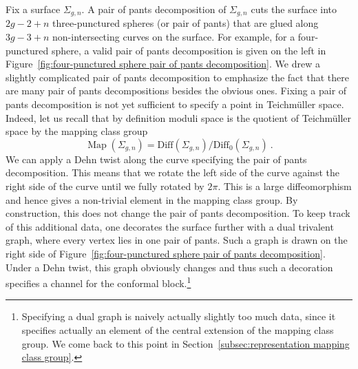 \documentclass[12pt,a4paper]{article}
\newcommand{\be}{\begin{equation}}
\newcommand{\ee}{\end{equation}}
\newcommand\Diff{\text{Diff}}
\DeclareMathOperator\Map{Map}
\begin{document}
Fix a surface $\Sigma_{g,n}$. A pair of pants decomposition of $\Sigma_{g,n}$ cuts the surface  into $2g-2+n$ three-punctured spheres (or pair of pants) that are glued along $3g-3+n$ non-intersecting curves on the surface. For example, for a four-punctured sphere, a valid pair of pants decomposition is given on the left in Figure~\ref{fig:four-punctured sphere pair of pants decomposition}. We drew a slightly complicated pair of pants decomposition to emphasize the fact that there are many pair of pants decompositions besides the obvious ones. Fixing a pair of pants decomposition is not yet sufficient to specify a point in Teichm\"uller space. Indeed, let us recall that by definition moduli space is the quotient of Teichm\"uller space by the mapping class group
\be 
\Map(\Sigma_{g,n})=\Diff(\Sigma_{g,n})/\Diff_0(\Sigma_{g,n})\ .
\ee
We can apply a Dehn twist along the curve specifying the pair of pants decomposition. This means that we rotate the left side of the curve against the right side of the curve until we fully rotated by $2\pi$. This is a large diffeomorphism and hence gives a non-trivial element in the mapping class group. By construction, this does not change the pair of pants decomposition. To keep track of this additional data, one decorates the surface further with a dual trivalent graph, where every vertex lies in one pair of pants. Such a graph is drawn on the right side of Figure~\ref{fig:four-punctured sphere pair of pants decomposition}. Under a Dehn twist, this graph obviously changes and thus such a decoration specifies a channel for the conformal block.\footnote{Specifying a dual graph is naively actually slightly too much data, since it specifies actually an element of the central extension of the mapping class group. We come back to this point in Section~\ref{subsec:representation mapping class group}.}
\end{document}
